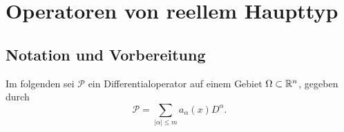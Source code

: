 \newcommand{\A}{\forall}
\newcommand{\E}{\exists}
\newcommand{\imp}{\Rightarrow}
\renewcommand{\labelenumi}{\roman{enumi})}

\newcommand{\Sph}{\mathbb S}
\renewcommand{\P}{\mathcal{P}}
\newcommand{\Pin}{\textbf{Pin}}
\newcommand{\Q}{\mathbb Q}
\renewcommand{\H}{\mathbb H}
\newcommand{\Ri}{\widetilde{R}}
\newcommand{\K}{\mathbb{K}}
\newcommand{\lle}{\preccurlyeq}
\newcommand{\G}{\mathcal{G}}
\newcommand{\M}{\widetilde{M}}
\newcommand{\Or}{\mathcal{O}}
\renewcommand{\le}{\leqslant}
\renewcommand{\ge}{\geqslant}
\renewcommand{\O}{\textbf{O}}
\newcommand{\SO}{\textbf{SO}}
\newcommand{\U}{\textbf{U}}
\newcommand{\Ad}{\text{Ad}}
\newcommand{\SU}{\textbf{SU}}
\newcommand{\Symp}{\textbf{Sp}}
\newcommand{\id}{\text{id}}
\newcommand{\Cl}{\textbf{Cl}}
\newcommand{\Ind}{\text{Ind}}
\newcommand{\proofed}{$\mbox{}$\hfill $\blacksquare{}$\\} 
\newcommand{\g}{\mathfrak{g}}
\renewcommand{\k}{\mathfrak{k}}
\newcommand{\m}{\mathfrak{m}}
\renewcommand{\o}{\overline}
\chapter{Operatoren von reellem Haupttyp}
\section{Notation und Vorbereitung}

Im folgenden sei $\P$ ein Differentialoperator auf einem Gebiet $\Omega \subset \mathbb R^n$, gegeben durch
\[
\P = \sum_{|\alpha| \le m} a_\alpha (x) D^\alpha.
\]


